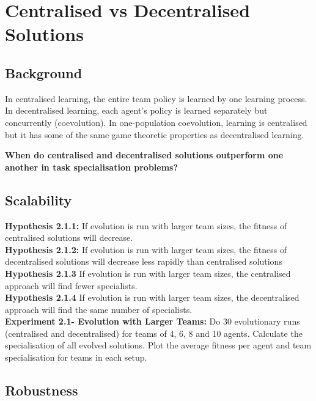 \documentclass[12pt]{article}
\begin{document}
\section{Centralised vs Decentralised Solutions}

\subsection{Background}

In centralised learning, the entire team policy is learned by one learning process.
In decentralised learning, each agent's policy is learned separately but concurrently (coevolution).
In one-population coevolution, learning is centralised but it has some of the same game theoretic properties as decentralised learning.



\textbf{When do centralised and decentralised solutions outperform one another in task specialisation problems?}\\

\subsection{Scalability}

\textbf{Hypothesis 2.1.1:} If evolution is run with larger team sizes, the fitness of centralised solutions will decrease.\\

\textbf{Hypothesis 2.1.2:} If evolution is run with larger team sizes, the fitness of decentralised solutions will decrease less rapidly than centralised solutions\\

\textbf{Hypothesis 2.1.3} If evolution is run with larger team sizes, the centralised approach will find fewer specialists.\\

\textbf{Hypothesis 2.1.4} If evolution is run with larger team sizes, the decentralised approach will find the same number of specialists.\\

\textbf{Experiment 2.1- Evolution with Larger Teams:} Do 30 evolutionary runs (centralised and decentralised) for teams of 4, 6, 8 and 10 agents.
Calculate the specialisation of all evolved solutions.
Plot the average fitness per agent and team specialisation for teams in each setup. \\

\subsection{Robustness}
\end{document}
